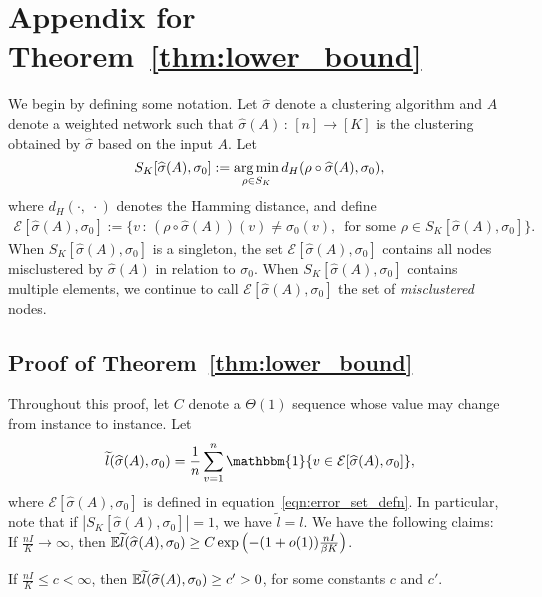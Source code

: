 \documentclass{article}
\begin{document}

\section{Appendix for Theorem~\ref{thm:lower_bound}}
\label{sec:lower_bound_proof}

We begin by defining some notation. Let $\hat{\sigma}$ denote a clustering algorithm and $A$ denote a weighted network such that $\hat{\sigma}(A) \,:\, [n] \rightarrow [K]$ is the clustering obtained by $\hat{\sigma}$ based on the input $A$. Let 
\[
S_K[ \widehat{\sigma}(A), \sigma_0] := \mathop{\text{\rm arg\,min}}_{\rho \in S_K} d_H(\rho \circ \widehat{\sigma}(A), \sigma_0), 
\] 
where $d_H(\cdot, \; \cdot)$ denotes the Hamming distance, and define
\begin{align}
\mathcal{E}[ \hat{\sigma}(A), \sigma_0] := \Big\{ v \,:\, (\rho \circ \hat{\sigma}(A))(v) \neq  \sigma_0(v),\, 
          \text{ for some } \rho \in S_K[\hat{\sigma}(A), \sigma_0]   \Big\}. \label{eqn:error_set_defn}
\end{align}
When $S_K[\hat{\sigma}(A), \sigma_0]$ is a singleton, the set $\mathcal{E}[\hat{\sigma}(A), \sigma_0]$ contains all nodes misclustered by $\hat{\sigma}(A)$ in relation to $\sigma_0$.
When $S_K[\hat{\sigma}(A), \sigma_0]$ contains multiple elements,
we continue to call $\mathcal{E}[\hat{\sigma}(A), \sigma_0]$ the set of \emph{misclustered} nodes.

\subsection{Proof of Theorem~\ref{thm:lower_bound}}
\label{sec:actual_lower_bound_proof}
Throughout this proof, let $C$ denote a $\Theta(1)$ sequence whose value may change from instance to instance. Let
\[
\tilde{l}(\hat{\sigma}(A), \sigma_0) = \frac{1}{n} 
     \sum_{v=1}^n \mathbbm{1}\{ v \in \mathcal{E}[\hat{\sigma}(A), \sigma_0]\},
\]
where $\mathcal{E}[\hat{\sigma}(A), \sigma_0]$ is defined in equation~\eqref{eqn:error_set_defn}. In particular, note that if $|S_K[\hat{\sigma}(A), \sigma_0]| = 1$, we have $\tilde{l} = l$. We have the following claims: \\

 If $\frac{nI}{K} \rightarrow \infty$, then ${\mathbb E} \widetilde{l}(\widehat{\sigma}(A), \sigma_0) \geq C\exp \left( - (1+o(1)) \frac{nI}{\beta K} \right)$.

 If $\frac{nI}{K} \leq c < \infty$, then ${\mathbb E} \widetilde{l}(\widehat{\sigma}(A), \sigma_0) \geq c' > 0$, for some constants $c$ and $c'$. \\
\end{document}

